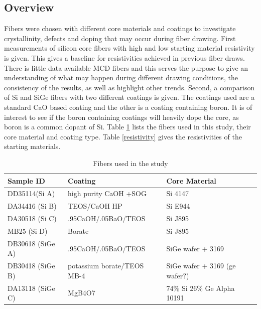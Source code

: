 \subsection{Overview}
Fibers were chosen with different core materials and coatings to investigate crystallinity, defects and doping that may occur during fiber drawing. First measurements of silicon core fibers with high and low starting material resistivity is given. This gives a baseline for resistivities achieved in previous fiber draws. There is little data available MCD fibers and this serves the purpose to give an understanding of what may happen during different drawing conditions, the consistency of the results, as well as highlight other trends. %
Second, a comparison of Si and SiGe fibers with two different coatings is given. The coatings used are  a standard CaO based coating \cite{Nordstrand2013AlkalineProduction} and the other is a coating containing boron. It is of interest to see if the boron containing coatings will heavily dope the core, as boron is a common dopant of Si. Table \ref{fibers} lists the fibers used in this study, their core material and coating type. Table \ref{resistivity} gives the resistivities of the starting materials.

 \begin{table}[h]
\begin{center}
    \begin{tabular}{|l|l|l|l|  }
    \hline
    \textbf{Sample ID} & \textbf{Coating} & \textbf{Core Material}   \\ \hline
    
      DD35114(Si A) & high purity CaOH +SOG & Si 4147 \\
      DA34416 (Si B) & TEOS/CaOH HP & Si E944 \\
      DA30518 (Si C) & .95CaOH/.05BaO/TEOS & Si J895  \\ 
      MB25 (Si D) & Borate & Si J895  \\
      DB30618 (SiGe A)& .95CaOH/.05BaO/TEOS & SiGe wafer \newline + 3169   \\ 
      DB30418 (SiGe B)& potassium borate/TEOS MB-4 & SiGe wafer \newline+ 3169 (ge wafer?)    \\ 
      DA13118 (SiGe C)& MgB4O7 & 74\% Si 26\% \newline Ge Alpha 10191 \\
     \hline
    \end{tabular}
\end{center}
\caption{Fibers used in the study}
\label{fibers}
\end{table}

